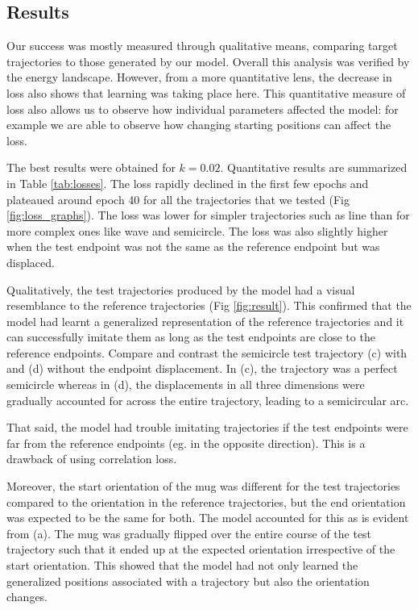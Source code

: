 \documentclass[10pt,twocolumn,letterpaper]{article}
\begin{document}
\subsection{Results}
\label{results}
Our success was mostly measured through qualitative means, comparing target trajectories to those generated by our model. Overall this analysis was verified by the energy landscape. However, from a more quantitative lens, the decrease in loss also shows that learning was taking place here. This quantitative measure of loss also allows us to observe how individual parameters affected the model: for example we are able to observe how changing starting positions can affect the loss.

The best results were obtained for $k = 0.02$.
Quantitative results are summarized in Table \ref{tab:losses}. The loss rapidly declined in the first few epochs and plateaued around epoch 40 for all the trajectories that we tested (Fig \ref{fig:loss_graphs}). The loss was lower for simpler trajectories such as line than for more complex ones like wave and semicircle. The loss was also slightly higher when the test endpoint was not the same as the reference endpoint but was displaced.

Qualitatively, the test trajectories produced by the model had a visual resemblance to the reference trajectories (Fig \ref{fig:result}). This confirmed that the model had learnt a generalized representation of the reference trajectories and it can successfully imitate them as long as the test endpoints are close to the reference endpoints. Compare and contrast the semicircle test trajectory (c) with and (d) without the endpoint displacement. In (c), the trajectory was a perfect semicircle whereas in (d), the displacements in all three dimensions were gradually accounted for across the entire trajectory, leading to a semicircular arc.

That said, the model had trouble imitating trajectories if the test endpoints were far from the reference endpoints (eg. in the opposite direction). This is a drawback of using correlation loss.

Moreover, the start orientation of the mug was different for the test trajectories compared to the orientation in the reference trajectories, but the end orientation was expected to be the same for both. The model accounted for this as is evident from (a). The mug was gradually flipped over the entire course of the test trajectory such that it ended up at the expected orientation irrespective of the start orientation. This showed that the model had not only learned the generalized positions associated with a trajectory but also the orientation changes.
\end{document}
